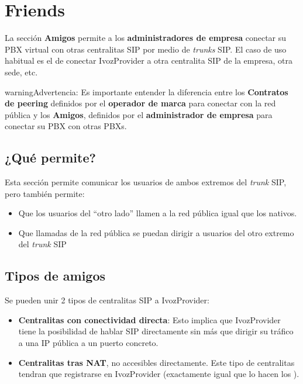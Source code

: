 \documentclass[letterpaper,10pt,spanish]{sphinxmanual}
\begin{document}
\section{Friends}
\label{pbx_features/friends:friends}\label{pbx_features/friends::doc}
La sección \textbf{Amigos} permite a los \textbf{administradores de empresa} conectar su PBX virtual con otras centralitas SIP por medio de \emph{trunks} SIP. El caso de uso habitual es el de conectar IvozProvider a otra centralita SIP de la empresa, otra sede, etc.

\begin{notice}{warning}{Advertencia:}
Es importante entender la diferencia entre los \textbf{Contratos de peering} definidos por el \textbf{operador de marca} para conectar con la red pública y los \textbf{Amigos}, definidos por el \textbf{administrador de empresa} para conectar su PBX con otras PBXs.
\end{notice}


\subsection{¿Qué permite?}
\label{pbx_features/friends:what-does-this-allow}
Esta sección permite comunicar los usuarios de ambos extremos del \emph{trunk} SIP, pero también permite:
\begin{itemize}
\item {} 
Que los usuarios del ``otro lado'' llamen a la red pública igual que los {\hyperref[pbx_features/users:users\string-configuration]{}} nativos.

\item {} 
Que llamadas de la red pública se puedan dirigir a usuarios del otro extremo del \emph{trunk} SIP

\end{itemize}


\subsection{Tipos de amigos}
\label{pbx_features/friends:types-of-friends}
Se pueden unir 2 tipos de centralitas SIP a IvozProvider:
\begin{itemize}
\item {} 
\textbf{Centralitas con conectividad directa}: Esto implica que IvozProvider tiene la posibilidad de hablar SIP directamente sin más que dirigir su tráfico a una IP pública a un puerto concreto.

\item {} 
\textbf{Centralitas tras NAT}, no accesibles directamente. Este tipo de centralitas tendran que registrarse en IvozProvider (exactamente igual que lo hacen los {\hyperref[pbx_features/terminals:terminals]{}}).

\end{itemize}
\end{document}
